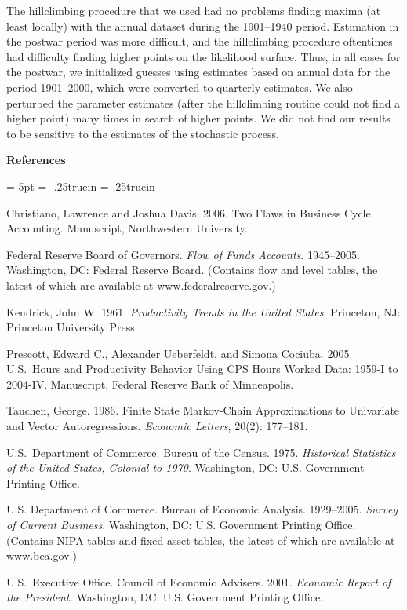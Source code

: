 The hillclimbing procedure that we used had no problems
finding maxima (at least locally) with the annual
dataset during the 1901--1940 period.  Estimation in 
the postwar period was more difficult, and the hillclimbing
procedure oftentimes had difficulty finding higher points
on the likelihood surface.  Thus, in all cases for the postwar,
we initialized guesses using estimates based on 
annual data for  the period 1901--2000, which were
converted to quarterly estimates.
We also perturbed the parameter estimates (after
the hillclimbing routine could not find a higher point)
many times in search of higher points.  
We did not find our results to be sensitive to
the estimates of the stochastic process.


\newpage
\centerline{\twelvepoint\bf  References}
\bigskip
\bigskip
{
                                                                                
\baselineskip=13pt
\parskip = 5pt
\parindent= -.25truein
\leftskip = .25truein
                                                                                
\vskip -10pt

Christiano, Lawrence and Joshua Davis. 2006.
Two Flaws in Business Cycle Accounting.
Manuscript, Northwestern University.

Federal Reserve Board of Governors.
{\it Flow of Funds Accounts}. 1945--2005.
Washington, DC: Federal Reserve Board.
(Contains flow and level tables, the latest of which
are available at www.federalreserve.gov.)

Kendrick, John W. 1961. 
{\it Productivity Trends in the United States}.
Princeton, NJ: Princeton University Press.

Prescott, Edward C., Alexander Ueberfeldt, and Simona Cociuba. 2005.
U.S.~Hours and Productivity Behavior Using CPS Hours
Worked Data: 1959-I to 2004-IV.
Manuscript, Federal Reserve Bank of Minneapolis.

Tauchen, George. 1986.
Finite State Markov-Chain Approximations to Univariate and 
 Vector Autoregressions.
{\it Economic Letters}, 20(2): 177--181.   

U.S.~Department of Commerce. 
Bureau of the Census. 1975.
{\it Historical Statistics of the United States, Colonial to 1970}.
Washington, DC: U.S. Government Printing Office.

U.S. Department of Commerce. 
Bureau of Economic Analysis. 1929--2005.
{\it Survey of Current Business}.
Washington, DC: U.S. Government Printing Office.
(Contains NIPA tables and fixed asset tables, the latest of which
               are available at www.bea.gov.)

U.S.~Executive Office. Council of Economic Advisers. 2001.
{\it Economic Report of the President.}
Washington, DC: U.S. Government Printing Office.

}

